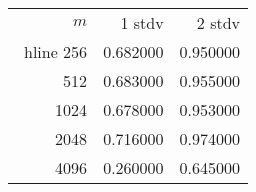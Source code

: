 \begin{tabular}{rrr}
$m$& 1 stdv & 2 stdv\\\ hline
256&0.682000&0.950000\\
512&0.683000&0.955000\\
1024&0.678000&0.953000\\
2048&0.716000&0.974000\\
4096&0.260000&0.645000\\
\end{tabular}
